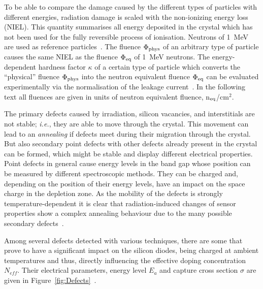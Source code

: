 To be able to compare the damage caused by the different types of particles with different energies, 
radiation damage is scaled with the non-ionizing energy loss (NIEL). This quantity summarises all 
energy deposited in the crystal which has not been used for the fully reversible process of ionisation. 
Neutrons of 1~MeV are used as reference particles~\cite{astm}. The fluence $\Phi_{\rm phys}$ of an arbitrary type 
of particle causes the same NIEL as the fluence $\Phi_{\rm eq}$ of 1~MeV neutrons.
The energy-dependent hardness factor $\kappa$ of a certain type of particle which converts the 
``physical'' fluence $\Phi_{\rm phys}$ into the neutron equivalent fluence $\Phi_{\rm eq}$ can be 
evaluated experimentally via the normalisation of the leakage 
current~\cite{MOLL2002100,rossi2006pixel}. In the following text all fluences are given in units of neutron equivalent fluence, n$_{\rm eq}$/cm$^2$. 

The primary defects caused by irradiation, silicon vacancies, and interstitials are not stable; {\it i.e.}, 
they 
are able to move through the crystal. This movement can lead to an {\it annealing} if defects 
meet during 
their migration through the crystal. But also secondary point defects with other defects already present 
in the crystal can be formed, which might be stable and display different electrical properties. Point 
defects in general cause energy levels in the band gap whose position can be measured by different 
spectroscopic methods. They can be charged and, depending on the position of their energy levels, 
have an impact on the space charge in the depletion zone. As the mobility of the defects is strongly 
temperature-dependent it is clear that radiation-induced changes of sensor properties show a complex 
annealing behaviour due to the many possible secondary defects~\cite{rossi2006pixel}.


Among several defects detected with various techniques, there are some that prove to have a significant impact
on the silicon diodes, being charged at ambient temperatures and thus, directly influencing the 
effective doping concentration $N_{eff}$. Their electrical parameters, energy level $E_a$ 
and capture cross section $\sigma$ are given in Figure~\ref{fig:Defects}~\cite{DefectsVertexing2016}.

